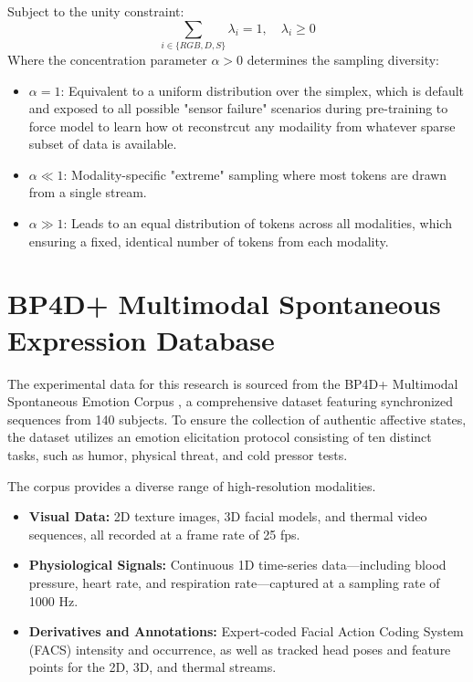 Subject to the unity constraint:
\begin{equation}
    \sum_{i \in \{RGB, D, S\}}\lambda_{i}= 1, \quad \lambda_{i}\geq 0
\end{equation}
Where the concentration parameter $\alpha > 0$ determines the sampling diversity:
\begin{itemize}
    \item $\alpha = 1$: Equivalent to a uniform distribution over the simplex, which
        is default and exposed to all possible "sensor failure" scenarios during
        pre-training to force model to learn how ot reconstrcut any modaility from
        whatever sparse subset of data is available.

    \item $\alpha \ll 1$: Modality-specific "extreme" sampling where most tokens
        are drawn from a single stream.

    \item $\alpha \gg 1$: Leads to an equal distribution of tokens across all
        modalities, which ensuring a fixed, identical number of tokens from each
        modality.
\end{itemize}




\section{BP4D+ Multimodal Spontaneous Expression Database}
The experimental data for this research is sourced from the BP4D+ Multimodal Spontaneous
Emotion Corpus \cite{zhang2013high}, a comprehensive dataset featuring
synchronized sequences from 140 subjects. To ensure the collection of authentic affective
states, the dataset utilizes an emotion elicitation protocol consisting of ten
distinct tasks, such as humor, physical threat, and cold pressor tests.

The corpus provides a diverse range of high-resolution modalities.
\begin{itemize}
    \item \textbf{Visual Data:} 2D texture images, 3D facial models, and thermal
        video sequences, all recorded at a frame rate of 25 fps.

    \item \textbf{Physiological Signals:} Continuous 1D time-series
        data---including blood pressure, heart rate, and respiration rate---captured
        at a sampling rate of 1000 Hz.

    \item \textbf{Derivatives and Annotations:} Expert-coded Facial Action
        Coding System (FACS) intensity and occurrence, as well as tracked head poses
        and feature points for the 2D, 3D, and thermal streams.
\end{itemize}

